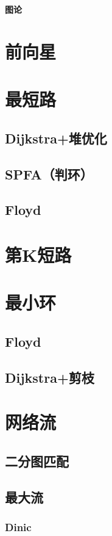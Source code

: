 \documentclass{article}
\begin{document}
\begin{titlepage}

\thispagestyle{empty}
\pagebreak
\textbf{图论}
\pagestyle{plain}
\tableofcontents
\end{titlepage}


\hspace{3em}
\section{﻿前向星}


\section{最短路}
\subsection{Dijkstra+堆优化}

\subsection{SPFA（判环）}

\subsection{Floyd}


\section{第K短路}


\section{最小环}
\subsection{Floyd}

\subsection{Dijkstra+剪枝}


\section{网络流}
\subsection{二分图匹配}

\subsection{最大流}
\subsubsection{Dinic}

\end{document}
